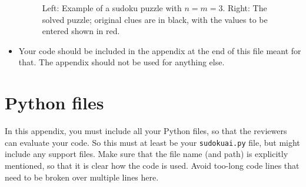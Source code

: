 \documentclass[11pt]{article}
\begin{document}
\begin{itemize}
\begin{figure}
			\caption{Left: Example of a sudoku puzzle with $n=m=3$. Right: The solved puzzle; original clues are in black, with the values to be entered shown in red.}\label{fig:example}
		\end{figure}
	\item
		Your code should be included in the appendix at the end of this file meant for that.
		The appendix should not be used for anything else.
\end{itemize}



\clearpage
\appendix

\section*{Python files}
In this appendix, you must include all your Python files, so that the reviewers can evaluate your code.
So this must at least be your \texttt{sudokuai.py} file, but might include any support files.
Make sure that the file name (and path) is explicitly mentioned, so that it is clear how the code is used.
Avoid too-long code lines that need to be broken over multiple lines here.




\end{document}
